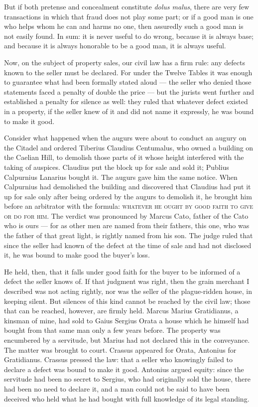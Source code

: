  But if both pretense and concealment constitute \textit{dolus malus}, there are very few transactions in which that fraud does not play some part; or if a good man is one who helps whom he can and harms no one, then assuredly such a good man is not easily found. In sum: it is never useful to do wrong, because it is always base; and because it is always honorable to be a good man, it is always useful.

 Now, on the subject of property sales, our civil law has a firm rule: any defects known to the seller must be declared. For under the Twelve Tables it was enough to guarantee what had been formally stated aloud — the seller who denied those statements faced a penalty of double the price — but the jurists went further and established a penalty for silence as well: they ruled that whatever defect existed in a property, if the seller knew of it and did not name it expressly, he was bound to make it good.

 Consider what happened when the augurs were about to conduct an augury on the Citadel and ordered Tiberius Claudius Centumalus, who owned a building on the Caelian Hill, to demolish those parts of it whose height interfered with the taking of auspices. Claudius put the block up for sale and sold it; Publius Calpurnius Lanarius bought it. The augurs gave him the same notice. When Calpurnius had demolished the building and discovered that Claudius had put it up for sale only after being ordered by the augurs to demolish it, he brought him before an arbitrator with the formula: \textsc{whatever he ought by good faith to give or do for him}. The verdict was pronounced by Marcus Cato, father of the Cato who is ours — for as other men are named from their fathers, this one, who was the father of that great light, is rightly named from his son. The judge ruled that since the seller had known of the defect at the time of sale and had not disclosed it, he was bound to make good the buyer's loss.

 He held, then, that it falls under good faith for the buyer to be informed of a defect the seller knows of. If that judgment was right, then the grain merchant I described was not acting rightly, nor was the seller of the plague-ridden house, in keeping silent. But silences of this kind cannot be reached by the civil law; those that can be reached, however, are firmly held. Marcus Marius Gratidianus, a kinsman of mine, had sold to Gaius Sergius Orata a house which he himself had bought from that same man only a few years before. The property was encumbered by a servitude, but Marius had not declared this in the conveyance. The matter was brought to court. Crassus appeared for Orata, Antonius for Gratidianus. Crassus pressed the law: that a seller who knowingly failed to declare a defect was bound to make it good. Antonius argued equity: since the servitude had been no secret to Sergius, who had originally sold the house, there had been no need to declare it, and a man could not be said to have been deceived who held what he had bought with full knowledge of its legal standing.


